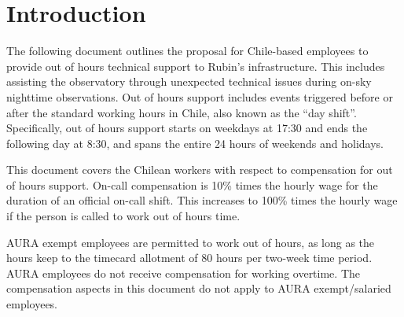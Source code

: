 \section{Introduction}

The following document outlines the proposal for Chile-based employees to provide out of hours technical support to Rubin's infrastructure.
This includes assisting the observatory through unexpected technical issues during on-sky nighttime observations.
Out of hours support includes events triggered before or after the standard working hours in Chile, also known as the ``day shift''.
Specifically, out of hours support starts on weekdays at 17:30 and ends the following day at 8:30, and spans the entire 24 hours of weekends and holidays.

This document covers the Chilean workers with respect to compensation for out of hours support.  
On-call compensation is 10\% times the hourly wage for the duration of an official on-call shift.  This increases to 100\% times the hourly wage if the person is called to work out of hours time.

AURA exempt employees are permitted to work out of hours, as long as the hours keep to the timecard allotment of 80 hours per two-week time period.  AURA employees do not receive compensation for working overtime.
The compensation aspects in this document do not apply to AURA exempt/salaried employees.